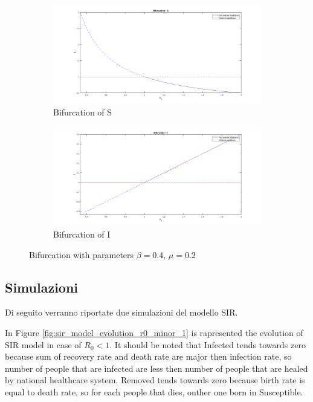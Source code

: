 \begin{figure}[h!]
    \centering
    \label{fig:bifurcation}
    \begin{subfigure}{\textwidth}
        \centering
        \includegraphics[width=\linewidth]{Figure/bifurcation_s.png}  
        \caption{Bifurcation of S}
        \label{fig:bifurcation_s}
    \end{subfigure}
    \begin{subfigure}{\textwidth}
        \centering
        \includegraphics[width=\linewidth]{Figure/bifurcation_i.png}  
        \caption{Bifurcation of I}
        \label{fig:bifurcation_i}
    \end{subfigure}
    \caption{Bifurcation with parameters $\beta = 0.4$, $\mu = 0.2$}
\end{figure}

\break


\subsection{Simulazioni}
Di seguito verranno riportate due simulazioni del modello SIR.

In Figure \ref{fig:sir_model_evolution_r0_minor_1} is rapresented the evolution of SIR model in case of $R_0 < 1$. It should be noted that Infected tends towards zero because sum of recovery rate and death rate are major then infection rate, so number of people that are infected are less then number of people that are healed by national healthcare system. Removed tends towards zero because birth rate is equal to death rate, so for each people that dies, onther one born in Susceptible.

